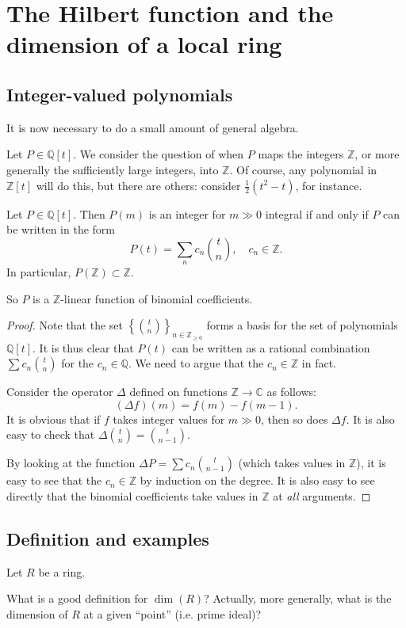 \section{The Hilbert function and the dimension of a local ring}
\subsection{Integer-valued polynomials}

It is now necessary to do a small amount of general algebra.

Let $P \in \mathbb{Q}[t]$. We consider the question of when $P$ maps the
integers $\mathbb{Z}$, or more generally the sufficiently large integers, into
$\mathbb{Z}$. Of course, any polynomial in $\mathbb{Z}[t]$ will do this, but
there are others: consider $\frac{1}{2}(t^2 -t)$, for instance.

\begin{proposition}\label{integervalued} 
Let $P \in \mathbb{Q}[t]$. Then $P(m)$ is an integer for $m \gg 0$ integral if and only if
$P$ can be written in the form
\[ P(t) = \sum_n c_n \binom{t}{n}, \quad c_n \in \mathbb{Z}.  \]
In particular, $P(\mathbb{Z}) \subset \mathbb{Z}$.
\end{proposition} 
So $P$ is a $\mathbb{Z}$-linear function of binomial coefficients. 
\begin{proof} 
Note that the set $\left\{\binom{t}{n}\right\}_{n \in \mathbb{Z}_{\geq 0}}$ forms a basis for the set of
polynomials $\mathbb{Q}[t]$. It is thus clear that $P(t)$ can be written as
a rational combination $\sum c_n \binom{t}{n}$ for the $c_n \in \mathbb{Q}$.
We need to argue that the $c_n \in \mathbb{Z}$ in fact.

Consider the operator $\Delta$ defined on functions $\mathbb{Z} \to
\mathbb{C}$ as follows:
\[( \Delta f)(m) = f(m) - f(m-1).  \]
It is obvious that if $f$ takes integer values for $m \gg 0$, then so does
$\Delta f$. It is also easy to check that $\Delta \binom{t}{n} =
\binom{t}{n-1}$.

By looking at the
function $\Delta P = \sum c_n \binom{t}{n-1}$ (which takes values in $\mathbb{Z}$), it is easy to see that the $c_n \in \mathbb{Z}$ by induction
on the degree. 
It is also easy to see directly that the binomial coefficients take values in
$\mathbb{Z}$ at \emph{all} arguments.
\end{proof} 



\subsection{Definition and examples}
Let $R$ be a   ring. 
\begin{question} 
What is a good definition for $\dim(R)$? Actually, more generally, 
what is the dimension of $R$ at a given ``point'' (i.e. prime ideal)?
\end{question} 


